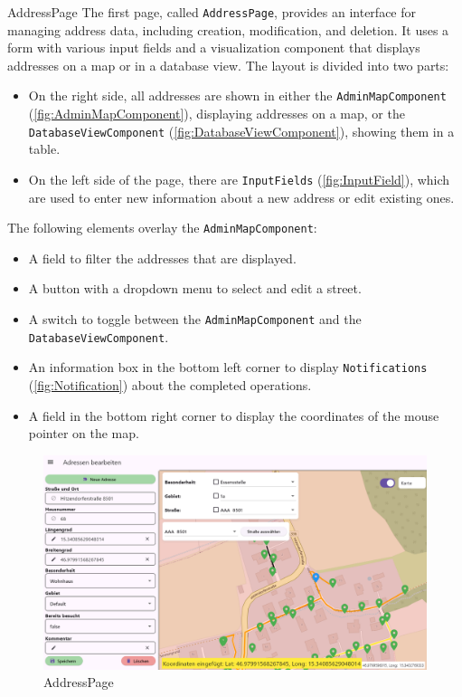\begin{subsection}{AddressPage}
    \sloppy
    The first page, called \texttt{AddressPage}, provides an interface for managing address data, including creation, modification, and deletion. It uses a form with various input fields and a visualization component that displays addresses on a map or in a database view. The layout is divided into two parts:

    \begin{itemize}
        \item On the right side, all addresses are shown in either the \texttt{AdminMapComponent} (\ref{fig:AdminMapComponent}), displaying addresses on a map, or the \texttt{DatabaseViewComponent} (\ref{fig:DatabaseViewComponent}), showing them in a table.
        \item On the left side of the page, there are \texttt{InputFields} (\ref{fig:InputField}), which are used to enter new information about a new address or edit existing ones.
    \end{itemize}

    \newpage

    The following elements overlay the \texttt{AdminMapComponent}:

    \begin{itemize}
        \item A field to filter the addresses that are displayed.
        \item A button with a dropdown menu to select and edit a street.
        \item A switch to toggle between the \texttt{AdminMapComponent} and the \texttt{DatabaseViewComponent}.
        \item An information box in the bottom left corner to display \texttt{Notifications} (\ref{fig:Notification}) about the completed operations.
        \item A field in the bottom right corner to display the coordinates of the mouse pointer on the map.
    \end{itemize}
    

    \begin{figure}[H]
        \centering
        \includegraphics[width=1\linewidth]{images/AdminPanel/AddressPage.png}
        \caption{AddressPage}
    \end{figure}
\end{subsection}

